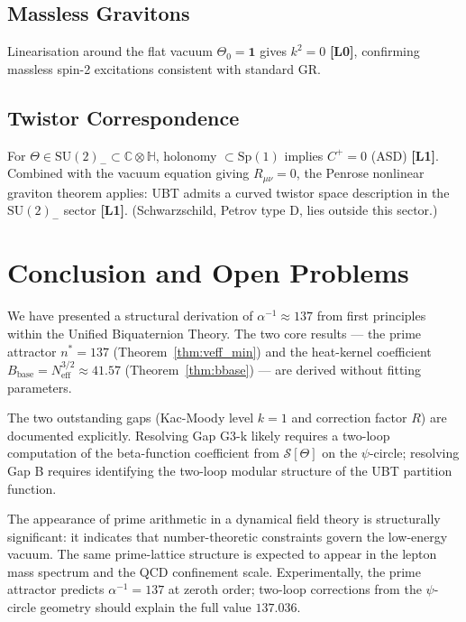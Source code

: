 \documentclass[11pt,a4paper]{article}
\theoremstyle{definition}
\theoremstyle{remark}
\newcommand{\Lzero}{\textbf{[L0]}}
\newcommand{\Lone}{\textbf{[L1]}}
\begin{document}
\subsection{Massless Gravitons}

Linearisation around the flat vacuum $\Theta_0 = \mathbf{1}$ gives
$k^2 = 0$ \Lzero, confirming massless spin-2 excitations consistent
with standard GR.

\subsection{Twistor Correspondence}

For $\Theta \in \mathrm{SU}(2)_- \subset \mathbb{C}\otimes\mathbb{H}$,
holonomy $\subset \mathrm{Sp}(1)$ implies $C^+ = 0$ (ASD) \Lone.
Combined with the vacuum equation giving $R_{\mu\nu} = 0$, the
Penrose nonlinear graviton theorem applies: UBT admits a curved twistor
space description in the $\mathrm{SU}(2)_-$ sector \Lone.
(Schwarzschild, Petrov type D, lies outside this sector.)

\section{Conclusion and Open Problems}
\label{sec:conclusion}

We have presented a structural derivation of $\alpha^{-1} \approx 137$ from
first principles within the Unified Biquaternion Theory. The two core results —
the prime attractor $n^* = 137$ (Theorem~\ref{thm:veff_min}) and the heat-kernel
coefficient $B_{\mathrm{base}} = N_{\mathrm{eff}}^{3/2} \approx 41.57$
(Theorem~\ref{thm:bbase}) — are derived without fitting parameters.

The two outstanding gaps (Kac-Moody level $k = 1$ and correction factor $R$)
are documented explicitly. Resolving Gap G3-k likely requires a two-loop
computation of the beta-function coefficient from $\mathcal{S}[\Theta]$ on
the $\psi$-circle; resolving Gap B requires identifying the two-loop modular
structure of the UBT partition function.

The appearance of prime arithmetic in a dynamical field theory is structurally
significant: it indicates that number-theoretic constraints govern the low-energy
vacuum. The same prime-lattice structure is expected to appear in the lepton mass
spectrum and the QCD confinement scale. Experimentally, the prime attractor
predicts $\alpha^{-1} = 137$ at zeroth order; two-loop corrections from the
$\psi$-circle geometry should explain the full value $137.036$.
\end{document}
